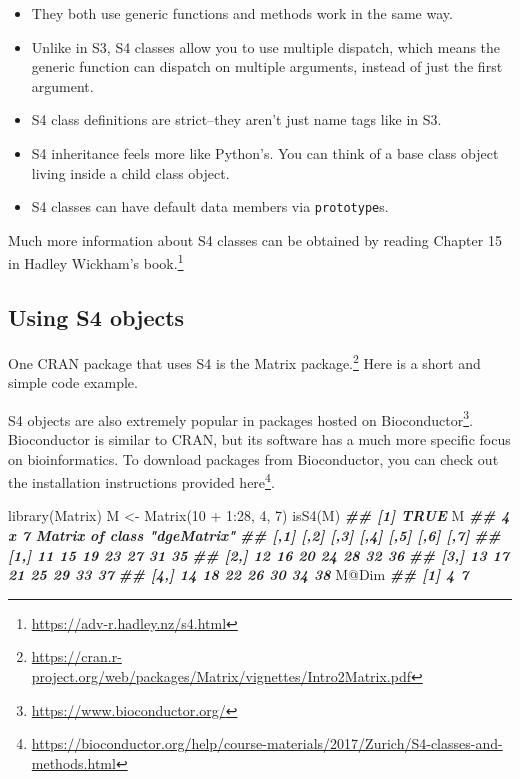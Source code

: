\documentclass[
  12pt,
  krantz2]{krantz}
\makeatletter
\newenvironment{Shaded}{\begin{snugshade}}{\end{snugshade}}
\newcommand{\DecValTok}[1]{\textcolor[rgb]{0.06,0.06,0.06}{#1}}
\newcommand{\DocumentationTok}[1]{\textcolor[rgb]{0.37,0.37,0.37}{\textbf{\textit{#1}}}}
\newcommand{\FunctionTok}[1]{\textcolor[rgb]{0,0,0}{#1}}
\newcommand{\NormalTok}[1]{#1}
\newcommand{\OtherTok}[1]{\textcolor[rgb]{0.37,0.37,0.37}{#1}}
\newcommand{\SpecialCharTok}[1]{\textcolor[rgb]{0,0,0}{#1}}
\providecommand{\tightlist}{%
  \setlength{\itemsep}{0pt}\setlength{\parskip}{0pt}}
\renewcommand{\href}[2]{#2\footnote{\url{#1}}}
\newenvironment{kframe}{%
\medskip{}
\setlength{\fboxsep}{.8em}
 \def\at@end@of@kframe{}%
 \ifinner\ifhmode%
  \def\at@end@of@kframe{\end{minipage}}%
  \begin{minipage}{\columnwidth}%
 \fi\fi%
 \def\FrameCommand##1{\hskip\@totalleftmargin \hskip-\fboxsep
 \colorbox{shadecolor}{##1}\hskip-\fboxsep
     \hskip-\linewidth \hskip-\@totalleftmargin \hskip\columnwidth}%
 \MakeFramed {\advance\hsize-\width
   \@totalleftmargin\z@ \linewidth\hsize
   \@setminipage}}%
 {\par\unskip\endMakeFramed%
 \at@end@of@kframe}
\renewenvironment{Shaded}{\begin{kframe}}{\end{kframe}}
\makeatother
\begin{document}
\begin{itemize}
\tightlist
\item
  They both use generic functions and methods work in the same way.
\item
  Unlike in S3, S4 classes allow you to use multiple dispatch, which means the generic function can dispatch on multiple arguments, instead of just the first argument.
\item
  S4 class definitions are strict--they aren't just name tags like in S3.
\item
  S4 inheritance feels more like Python's. You can think of a base class object living inside a child class object.
\item
  S4 classes can have default data members via \texttt{prototype}s.
\end{itemize}

Much more information about S4 classes can be obtained by reading \href{https://adv-r.hadley.nz/s4.html}{Chapter 15 in Hadley Wickham's book.}

\hypertarget{using-s4-objects}{%
\subsection{Using S4 objects}\label{using-s4-objects}}

One CRAN package that uses S4 is the \href{https://cran.r-project.org/web/packages/Matrix/vignettes/Intro2Matrix.pdf}{Matrix package.} Here is a short and simple code example.

\begin{rmd-details}
S4 objects are also extremely popular in packages hosted on \href{https://www.bioconductor.org/}{Bioconductor}. Bioconductor is similar to CRAN, but its software has a much more specific focus on bioinformatics. To download packages from Bioconductor, you can check out the installation instructions provided \href{https://bioconductor.org/help/course-materials/2017/Zurich/S4-classes-and-methods.html}{here}.

\end{rmd-details}

\begin{Shaded}
\begin{Highlighting}[]
\FunctionTok{library}\NormalTok{(Matrix)}
\NormalTok{M }\OtherTok{\textless{}{-}} \FunctionTok{Matrix}\NormalTok{(}\DecValTok{10} \SpecialCharTok{+} \DecValTok{1}\SpecialCharTok{:}\DecValTok{28}\NormalTok{, }\DecValTok{4}\NormalTok{, }\DecValTok{7}\NormalTok{)}
\FunctionTok{isS4}\NormalTok{(M)}
\DocumentationTok{\#\# [1] TRUE}
\NormalTok{M}
\DocumentationTok{\#\# 4 x 7 Matrix of class "dgeMatrix"}
\DocumentationTok{\#\#      [,1] [,2] [,3] [,4] [,5] [,6] [,7]}
\DocumentationTok{\#\# [1,]   11   15   19   23   27   31   35}
\DocumentationTok{\#\# [2,]   12   16   20   24   28   32   36}
\DocumentationTok{\#\# [3,]   13   17   21   25   29   33   37}
\DocumentationTok{\#\# [4,]   14   18   22   26   30   34   38}
\NormalTok{M}\SpecialCharTok{@}\NormalTok{Dim}
\DocumentationTok{\#\# [1] 4 7}
\end{Highlighting}
\end{Shaded}
\end{document}
